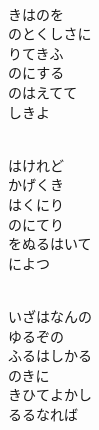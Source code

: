 \documentclass[10pt,b5j]{tarticle} %
\begin{document}
\begin{enumerate}
\begin{minipage}[c]{\blocksize}
        \vspace{\linespace}
        \item~\\
        きはのを\\
        のとくしさに\\
        りてきふ\\
        のにする\\
        のはえてて\\
        しきよ
        
        \vspace{\linespace}
        \item~\\
        はけれど\\
        かげくき\\
        はくにり\\
        のにてり\\
        をぬるはいて\\
        によつ
        
        \vspace{\linespace}
        \item~\\
        いざはなんの\\
        ゆるぞの\\
        ふるはしかる\\
        のきに\\
        きひてよかし\\
        るるなれば
    
    \end{minipage}
\end{enumerate} %
\end{document}
